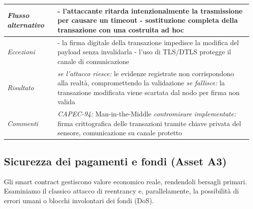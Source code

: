 \begin{longtable}{| >{\columncolor{abuseCol}}p{} | p{} |}
\hline
\textit{Flusso alternativo} & - l'attaccante ritarda intenzionalmente la trasmissione per causare un timeout \newline - sostituzione completa della transazione con una costruita ad hoc \\
\hline
\textit{Eccezioni} & - la firma digitale della transazione impedisce la modifica del payload senza invalidarla \newline - l'uso di TLS/DTLS protegge il canale di comunicazione \\
\hline
\textit{Risultato} & \textit{se l'attacco riesce:} le evidenze registrate non corrispondono alla realtà, compromettendo la validazione \newline \textit{se fallisce:} la transazione modificata viene scartata dal nodo per firma non valida \\
\hline
\textit{Commenti} & \textit{CAPEC-94:} Man-in-the-Middle \newline \textit{contromisure implementate:} firma crittografica delle transazioni tramite chiave privata del sensore, comunicazione su canale protetto \\
\hline
\end{longtable}

\subsection{Sicurezza dei pagamenti e fondi (Asset A3)}
Gli smart contract gestiscono valore economico reale, rendendoli bersagli primari. Esaminiamo il classico attacco di reentrancy e, parallelamente, la possibilità di errori umani o blocchi involontari dei fondi (DoS).

